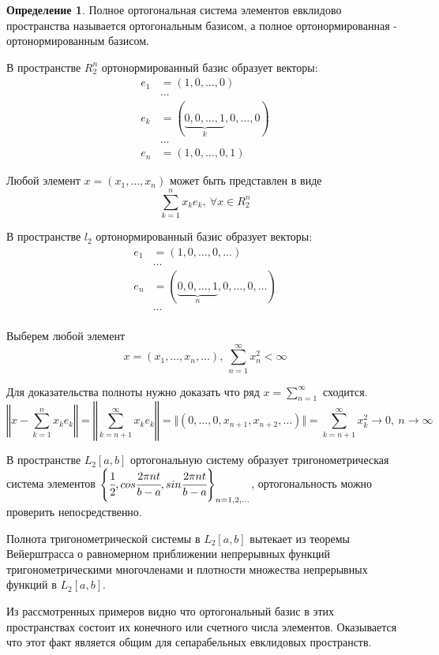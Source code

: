 \documentclass[14pt]{extarticle}
\theoremstyle{definition}
\newtheorem{definition}{Определение}[section]
\theoremstyle{remark}
\renewcommand{\[}{\begin{dmath*}[compact]}
\renewcommand{\]}{\end{dmath*}}
\newcommand{\sep}{ , \ \allowbreak }
\begin{document}
\begin{definition}
  Полное ортогональная система элементов евклидово пространства
  называется ортогональным базисом,
  а полное ортонормированная - ортонормированным базисом.
\end{definition}

В пространстве $R_2^n$ ортонормированный базис образует векторы:
\begin{align*}
  e_1&=(1,0,\dots,0) \\
  &\dots \\
  e_k&=(\underbrace{0,0,\dots,1}_k,0,\dots,0) \\
  &\dots \\
  e_n&=(1,0,\dots,0,1)
\end{align*}

Любой элемент $x=(x_1,\dots,x_n)$ может быть представлен в виде
\[\sum_{k=1}^n x_k e_k \sep {\forall x \in R_2^n}\]

В пространстве $l_2$ ортонормированный базис образует векторы:
\begin{align*}
  e_1&=(1,0,\dots,0,\dots) \\
  &\dots \\
  e_n&=(\underbrace{0,0,\dots,1}_n,0,\dots,0,\dots) \\
  &\dots \\
\end{align*}

Выберем любой элемент
\[x=(x_1,\dots,x_n,\dots) \sep \sum_{n=1}^\infty x_n^2 < \infty\]

Для доказательства полноты нужно доказать что ряд
$x = \sum_{n=1}^\infty$ сходится.
\[\left\Vert x - \sum_{k=1}^n x_k e_k \right\Vert \allowbreak
= \left\Vert \sum_{k=n+1}^\infty x_k e_k \right\Vert \allowbreak
= \Vert (0,\dots,0,x_{n+1}, x_{n+2},\dots) \Vert \allowbreak
= \sum_{k=n+1}^\infty x_k^2 \to 0 \sep {n \to \infty} \]

В пространстве $L_2[a,b]$ ортогональную систему образует
тригонометрическая система элементов
$\left\{ \cfrac{1}{2}, cos \cfrac{2 \pi n t}{b-a} ,
sin \cfrac{2 \pi nt}{b-a} \right\}_{n=1,2,\dots} $,
ортогональность можно проверить непосредственно.

Полнота тригонометрической системы в $L_2[a,b]$ вытекает из теоремы Вейерштрасса
о равномерном приближении непрерывных функций тригонометрическими многочленами и
плотности множества непрерывных функций в $L_2[a,b]$.

Из рассмотренных примеров видно что ортогональный базис в этих пространствах
состоит их конечного или счетного числа элементов. Оказывается что этот факт
является общим для сепарабельных евклидовых пространств.
\end{document}
